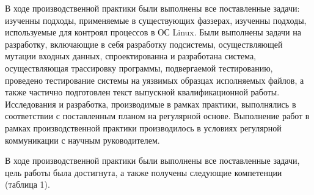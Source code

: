 \label{sec:conclusion}

В ходе производственной практики были выполнены все поставленные задачи: изученны подходы, применяемые в существующих фаззерах, изученны подходы, используемые для контроял процессов в ОС Linux. Были выполнены задачи на разработку, включающие в себя разработку подсистемы, осуществляющей мутации входных данных, спроектированна и разработана система, осуществляющая трассировку программы, подвергаемой тестированию, проведено тестирование системы на уязвимых образцах исполняемых файлов, а также частично подготовлен текст выпускной квалификационной работы. Исследования и разработка, производимые в рамках практики, выполнялись в соответствии с поставленным планом на регулярной основе. Выполнение работ в рамках производственной практики производилось в условиях регулярной коммуникации с научным руководителем.

В ходе производственной практики были выполнены все поставленные задачи, цель работы была достигнута, а также получены следующие компетенции (таблица 1).

